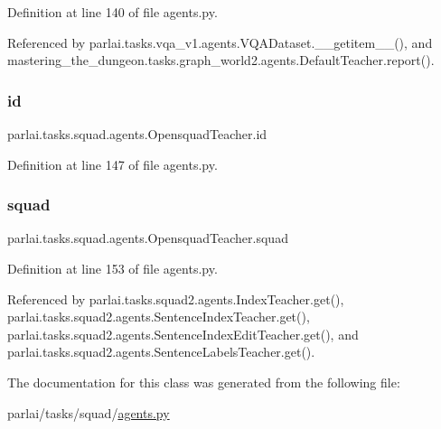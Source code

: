 Definition at line 140 of file agents.\+py.



Referenced by parlai.\+tasks.\+vqa\+\_\+v1.\+agents.\+V\+Q\+A\+Dataset.\+\_\+\+\_\+getitem\+\_\+\+\_\+(), and mastering\+\_\+the\+\_\+dungeon.\+tasks.\+graph\+\_\+world2.\+agents.\+Default\+Teacher.\+report().

\mbox{\label{classparlai_1_1tasks_1_1squad_1_1agents_1_1OpensquadTeacher_a623ab6df284c53f1266c9a24e95c981b}} 
\subsubsection{\texorpdfstring{id}{id}}
{\footnotesize\ttfamily parlai.\+tasks.\+squad.\+agents.\+Opensquad\+Teacher.\+id}



Definition at line 147 of file agents.\+py.

\mbox{\label{classparlai_1_1tasks_1_1squad_1_1agents_1_1OpensquadTeacher_af69eaf825785fc1f53f34aa45e5b6c3f}} 
\subsubsection{\texorpdfstring{squad}{squad}}
{\footnotesize\ttfamily parlai.\+tasks.\+squad.\+agents.\+Opensquad\+Teacher.\+squad}



Definition at line 153 of file agents.\+py.



Referenced by parlai.\+tasks.\+squad2.\+agents.\+Index\+Teacher.\+get(), parlai.\+tasks.\+squad2.\+agents.\+Sentence\+Index\+Teacher.\+get(), parlai.\+tasks.\+squad2.\+agents.\+Sentence\+Index\+Edit\+Teacher.\+get(), and parlai.\+tasks.\+squad2.\+agents.\+Sentence\+Labels\+Teacher.\+get().



The documentation for this class was generated from the following file\+:\begin{DoxyCompactItemize}
\item 
parlai/tasks/squad/\hyperlink{parlai_2tasks_2squad_2agents_8py}{agents.\+py}\end{DoxyCompactItemize}
